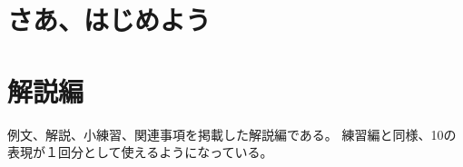 \documentclass[
uplatex,
b5paper,
10pt,
dvipdfmx
]{jsbook}
\newif\ifEnglish
\begin{document}
\setcounter{tocdepth}{0}
\tableofcontents

\mainmatter

\ifEnglish
\chapter{Getting Started}
\else
\chapter{さあ、はじめよう}
\fi

\ifEnglish
\else
\fi



\label{113010_11Dec18} %





\ifEnglish
\chapter{Commentary}

\else
\chapter{解説編}

\fi

例文、解説、小練習、関連事項を掲載した解説編である。
練習編と同様、10の表現が１回分として使えるようになっている。
\end{document}
